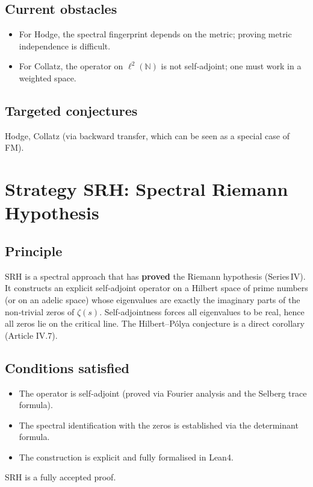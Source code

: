 \documentclass[11pt,a4paper]{article}
\begin{document}
\subsection{Current obstacles}
\begin{itemize}
\item For Hodge, the spectral fingerprint depends on the metric; proving metric independence is difficult.
\item For Collatz, the operator on \(\ell^2(\mathbb{N})\) is not self‑adjoint; one must work in a weighted space.
\end{itemize}

\subsection{Targeted conjectures}
Hodge, Collatz (via backward transfer, which can be seen as a special case of FM).

\section{Strategy SRH: Spectral Riemann Hypothesis}

\subsection{Principle}
SRH is a spectral approach that has \textbf{proved} the Riemann hypothesis (Series IV). It constructs an explicit self‑adjoint operator on a Hilbert space of prime numbers (or on an adelic space) whose eigenvalues are exactly the imaginary parts of the non‑trivial zeros of \(\zeta(s)\). Self‑adjointness forces all eigenvalues to be real, hence all zeros lie on the critical line. The Hilbert–Pólya conjecture is a direct corollary (Article IV.7).

\subsection{Conditions satisfied}
\begin{itemize}
\item The operator is self‑adjoint (proved via Fourier analysis and the Selberg trace formula).
\item The spectral identification with the zeros is established via the determinant formula.
\item The construction is explicit and fully formalised in Lean4.
\end{itemize}
SRH is a fully accepted proof.
\end{document}
